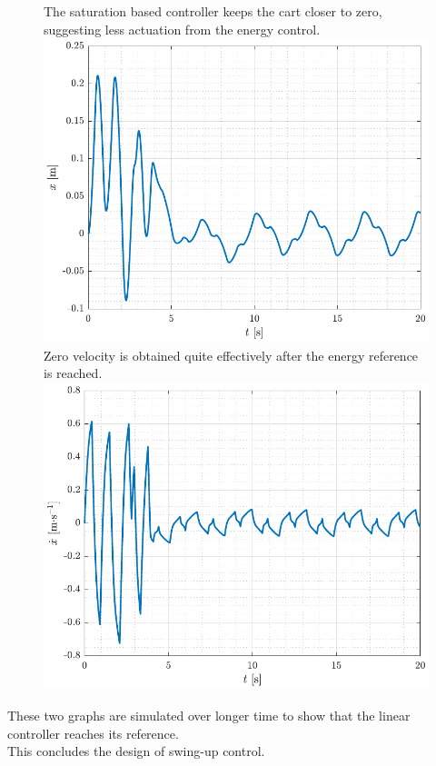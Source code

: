 \begin{figure}[H]
  \hspace{-10pt}
  \captionbox
  {
    The saturation based controller keeps the cart closer to zero, suggesting less actuation from the energy control.
    \label{fig:x_4_conX}
  }
  {
    \hspace{-1cm}
    \includegraphics[width=.4\textwidth]{figures/x_4_conX}
  }
  \hspace{20pt}
  \captionbox 
  {
    Zero velocity is obtained quite effectively after the energy reference is reached.
    \label{fig:xDot_4_conX}
  }
  {
    \hspace{-1cm}
    \includegraphics[width=.4\textwidth]{figures/xDot_4_conX}
  }  
\end{figure}
%
These two graphs are simulated over longer time to show that the linear controller reaches its reference.\\
This concludes the design of swing-up control.
%
%
%
